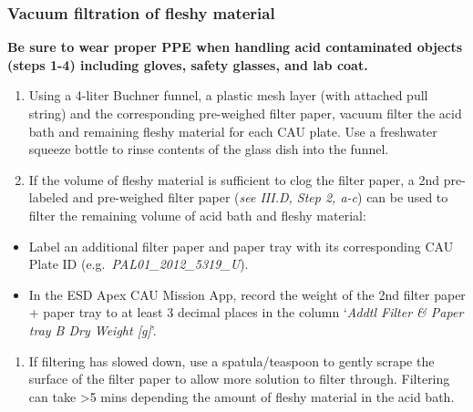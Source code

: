 \documentclass[]{book}
\providecommand{\tightlist}{%
  \setlength{\itemsep}{0pt}\setlength{\parskip}{0pt}}
\begin{document}
\hypertarget{vacuum-filtration-of-fleshy-material}{%
\subsubsection{Vacuum filtration of fleshy material}\label{vacuum-filtration-of-fleshy-material}}

\textbf{Be sure to wear proper PPE when handling acid contaminated objects (steps 1-4) including gloves, safety glasses, and lab coat.}

\begin{enumerate}
\def\labelenumi{\arabic{enumi}.}
\item
  Using a 4-liter Buchner funnel, a plastic mesh layer (with attached pull string) and the corresponding pre-weighed filter paper, vacuum filter the acid bath and remaining fleshy material for each CAU plate. Use a freshwater squeeze bottle to rinse contents of the glass dish into the funnel.
\item
  If the volume of fleshy material is sufficient to clog the filter paper, a 2nd pre-labeled and pre-weighed filter paper (\emph{see III.D, Step 2, a-c}) can be used to filter the remaining volume of acid bath and fleshy material:
\end{enumerate}

\begin{itemize}
\item
  Label an additional filter paper and paper tray with its corresponding CAU Plate ID (e.g.~\emph{PAL01\_2012\_5319\_U}).
\item
  In the ESD Apex CAU Mission App, record the weight of the 2nd filter paper + paper tray to at least 3 decimal places in the column `\emph{Addtl Filter \& Paper tray B Dry Weight {[}g{]}}'.
\end{itemize}

\begin{enumerate}
\def\labelenumi{\arabic{enumi}.}
\setcounter{enumi}{2}
\tightlist
\item
  If filtering has slowed down, use a spatula/teaspoon to gently scrape the surface of the filter paper to allow more solution to filter through. Filtering can take \textgreater5 mins depending the amount of fleshy material in the acid bath.
\end{enumerate}
\end{document}
